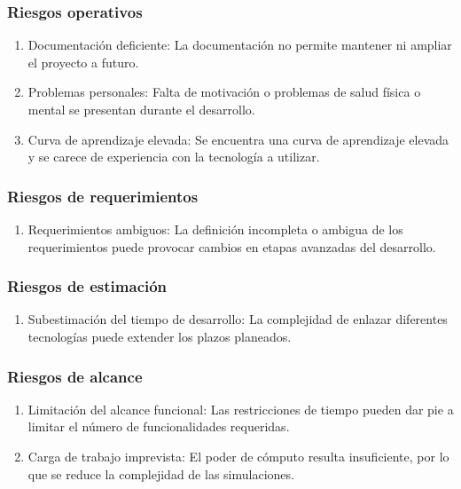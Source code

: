 \subsubsection{Riesgos operativos}
\begin{enumerate}[label*=RO\arabic*, noitemsep]
	\item Documentación deficiente: La documentación no permite mantener ni ampliar el proyecto a futuro.
	
	\item Problemas personales: Falta de motivación o problemas de salud física o mental se presentan durante el desarrollo.
	
	\item Curva de aprendizaje elevada: Se encuentra una curva de aprendizaje elevada y se carece de experiencia con la tecnología a utilizar.
\end{enumerate}
\subsubsection{Riesgos de requerimientos}
\begin{enumerate}[label*=RR\arabic*, noitemsep]
	\item Requerimientos ambiguos: La definición incompleta o ambigua de los requerimientos puede provocar cambios en etapas avanzadas del desarrollo.
\end{enumerate}

\subsubsection{Riesgos de estimación}
\begin{enumerate}[label*=RE\arabic*, noitemsep]
	\item Subestimación del tiempo de desarrollo: La complejidad de enlazar diferentes tecnologías puede extender los plazos planeados.
\end{enumerate}

\subsubsection{Riesgos de alcance}
\begin{enumerate}[label*=RA\arabic*, noitemsep]
	\item Limitación del alcance funcional: Las restricciones de tiempo pueden dar pie a limitar el número de funcionalidades requeridas.

	\item Carga de trabajo imprevista: El poder de cómputo resulta insuficiente, por lo que se reduce la complejidad de las simulaciones.
\end{enumerate}

